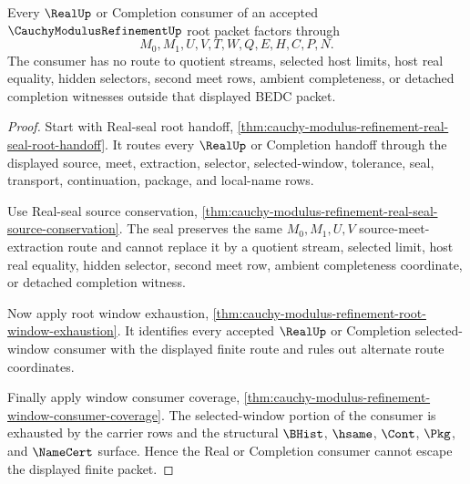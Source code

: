 \begin{theorem}
\label{thm:cauchy-modulus-refinement-real-consumer-nonescape}
Every $\RealUp$ or Completion consumer of an accepted $\CauchyModulusRefinementUp$ root packet factors through
$$
M_0,M_1,U,V,T,W,Q,E,H,C,P,N.
$$
The consumer has no route to quotient streams, selected host limits, host real equality, hidden selectors, second meet rows, ambient completeness, or detached completion witnesses outside that displayed BEDC packet.
\end{theorem}
\begin{proof}
Start with Real-seal root handoff, \autoref{thm:cauchy-modulus-refinement-real-seal-root-handoff}. It routes every $\RealUp$ or Completion handoff through the displayed source, meet, extraction, selector, selected-window, tolerance, seal, transport, continuation, package, and local-name rows.

Use Real-seal source conservation, \autoref{thm:cauchy-modulus-refinement-real-seal-source-conservation}. The seal preserves the same $M_0,M_1,U,V$ source-meet-extraction route and cannot replace it by a quotient stream, selected limit, host real equality, hidden selector, second meet row, ambient completeness coordinate, or detached completion witness.

Now apply root window exhaustion, \autoref{thm:cauchy-modulus-refinement-root-window-exhaustion}. It identifies every accepted $\RealUp$ or Completion selected-window consumer with the displayed finite route and rules out alternate route coordinates.

Finally apply window consumer coverage, \autoref{thm:cauchy-modulus-refinement-window-consumer-coverage}. The selected-window portion of the consumer is exhausted by the carrier rows and the structural $\BHist$, $\hsame$, $\Cont$, $\Pkg$, and $\NameCert$ surface. Hence the Real or Completion consumer cannot escape the displayed finite packet.
\end{proof}


